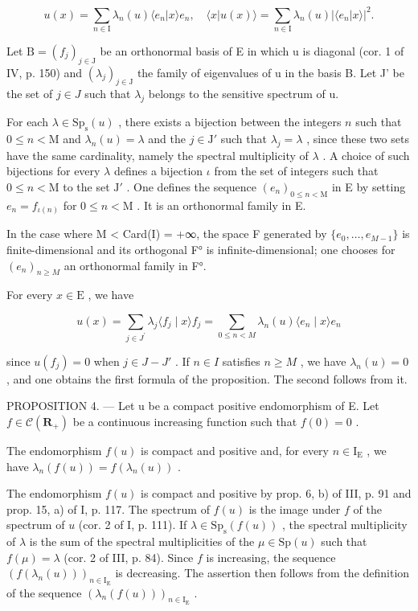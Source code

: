 \[
u (x) = \sum_ {n \in \mathrm{I}} \lambda_ {n} (u) \langle e _ {n} | x \rangle e _ {n}, \quad \langle x | u (x) \rangle = \sum_ {n \in \mathrm{I}} \lambda_ {n} (u) | \langle e _ {n} | x \rangle | ^ {2}.
\]

Let \(\mathrm{B} = (f_{j})_{j \in \mathrm{J}}\) be an orthonormal basis of E in which u is diagonal (cor. 1 of IV, p. 150) and \((\lambda_{j})_{j \in \mathrm{J}}\) the family of eigenvalues of u in the basis B. Let J' be the set of \(j \in J\) such that \(\lambda_{j}\) belongs to the sensitive spectrum of u.

For each \(\lambda \in \mathrm{Sp}_{\mathrm{s}}(u)\) , there exists a bijection between the integers \(n\) such that \(0 \leqslant n < \mathrm{M}\) and \(\lambda_{n}(u) = \lambda\) and the \(j \in \mathrm{J}'\) such that \(\lambda_{j} = \lambda\) , since these two sets have the same cardinality, namely the spectral multiplicity of \(\lambda\) . A choice of such bijections for every \(\lambda\) defines a bijection \(\iota\) from the set of integers such that \(0 \leqslant n < \mathrm{M}\) to the set \(\mathrm{J}'\) . One defines the sequence \((e_n)_{0 \leqslant n < \mathrm{M}}\) in E by setting \(e_n = f_{\iota(n)}\) for \(0 \leqslant n < \mathrm{M}\) . It is an orthonormal family in E.

In the case where M \textless{} Card(I) = +∞, the space F generated by \(\{e_{0},\ldots,e_{M-1}\}\) is finite-dimensional and its orthogonal F° is infinite-dimensional; one chooses for \((e_{n})_{n\geqslant M}\) an orthonormal family in F°.

For every \(x \in \mathrm{E}\) , we have

\[
u (x) = \sum_ {j \in J ^ {\prime}} \lambda_ {j} \langle f _ {j} \mid x \rangle f _ {j} = \sum_ {0 \leqslant n <   M} \lambda_ {n} (u) \langle e _ {n} \mid x \rangle e _ {n}
\]

since \(u(f_{j}) = 0\) when \(j \in J - J'\) . If \(n \in I\) satisfies \(n \geqslant M\) , we have \(\lambda_{n}(u) = 0\) , and one obtains the first formula of the proposition. The second follows from it.

PROPOSITION 4. --- Let u be a compact positive endomorphism of E. Let \(f \in \mathcal{C}(\mathbf{R}_{+})\) be a continuous increasing function such that \(f(0) = 0\) .

The endomorphism \(f(u)\) is compact and positive and, for every \(n \in \mathrm{I}_{\mathrm{E}}\) , we have \(\lambda_n(f(u)) = f(\lambda_n(u))\) .

The endomorphism \(f(u)\) is compact and positive by prop. 6, b) of III, p. 91 and prop. 15, a) of I, p. 117. The spectrum of \(f(u)\) is the image under \(f\) of the spectrum of \(u\) (cor. 2 of I, p. 111). If \(\lambda \in \mathrm{Sp}_{\mathrm{s}}(f(u))\) , the spectral multiplicity of \(\lambda\) is the sum of the spectral multiplicities of the \(\mu \in \mathrm{Sp}(u)\) such that \(f(\mu) = \lambda\) (cor. 2 of III, p. 84). Since \(f\) is increasing, the sequence \((f(\lambda_n(u)))_{n \in \mathrm{I_E}}\) is decreasing. The assertion then follows from the definition of the sequence \((\lambda_n(f(u)))_{n \in \mathrm{I_E}}\) .

